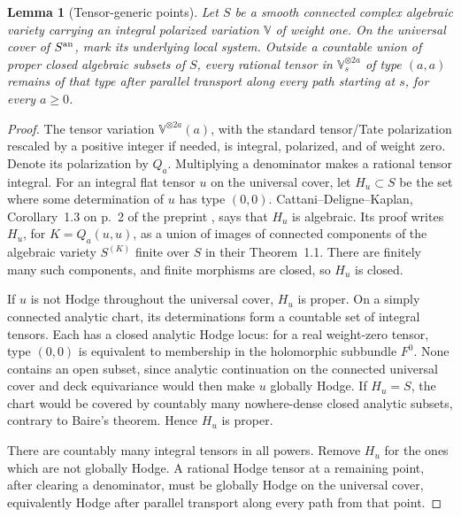 \documentclass[11pt]{article}
\newcommand{\V}{\mathbb V}
\theoremstyle{plain}
\newtheorem{lemma}[theorem]{Lemma}
\theoremstyle{definition}
\theoremstyle{remark}
\numberwithin{equation}{section}
\begin{document}
\begin{lemma}[Tensor-generic points]\label{lem:tensor-generic}
Let \(S\) be a smooth connected complex algebraic variety carrying
an integral polarized variation \(\V\) of weight one.  On the
universal cover of \(S^{\rm an}\), mark its underlying local system.
Outside a countable union of proper closed algebraic subsets of \(S\),
every rational tensor in \(\V_s^{\otimes 2a}\) of type \((a,a)\)
remains of that type after parallel transport along every path
starting at \(s\), for every \(a\geq0\).
\end{lemma}
\begin{proof}
The tensor variation \(\V^{\otimes 2a}(a)\), with the standard
tensor/Tate polarization rescaled by a positive integer if needed,
is integral, polarized, and of weight zero.  Denote its polarization
by \(Q_a\).
Multiplying a denominator makes a rational tensor integral.
For an integral flat tensor \(u\) on the universal cover, let
\(H_u\subset S\) be the set where some determination of \(u\)
has type \((0,0)\).  Cattani--Deligne--Kaplan,
Corollary~1.3 on p.~2 of the preprint \cite{CDK}, says
that \(H_u\) is algebraic.  Its proof writes \(H_u\), for
\(K=Q_a(u,u)\), as a union of images of connected components of
the algebraic variety \(S^{(K)}\) finite over \(S\) in their
Theorem~1.1.  There are finitely many such components, and finite
morphisms are closed, so \(H_u\) is closed.

If \(u\) is not Hodge throughout the universal cover, \(H_u\)
is proper.  On a simply connected analytic chart, its determinations
form a countable set of integral tensors.  Each has a closed analytic
Hodge locus: for a real weight-zero tensor, type \((0,0)\) is
equivalent to membership in the holomorphic subbundle \(F^0\).
None contains an open subset, since analytic continuation on the
connected universal cover and deck equivariance would then make
\(u\) globally Hodge.  If \(H_u=S\), the chart would be covered
by countably many nowhere-dense closed analytic subsets, contrary
to Baire's theorem.  Hence \(H_u\) is proper.

There are countably many integral tensors in all powers.  Remove
\(H_u\) for the ones which are not globally Hodge.  A rational
Hodge tensor at a remaining point, after clearing a denominator,
must be globally Hodge on the universal cover, equivalently
Hodge after parallel transport along every path from that point.
\end{proof}
\end{document}
